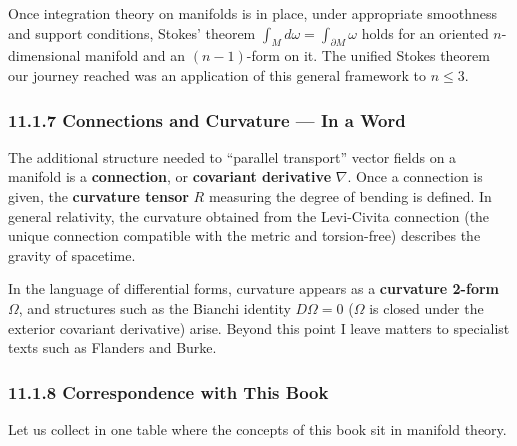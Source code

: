 \documentclass[a4paper,12pt,openany]{book}
\begin{document}
Once integration theory on manifolds is in place, under appropriate
smoothness and support conditions, Stokes' theorem
\(\int_M d\omega = \int_{\partial M} \omega\) holds for an oriented
\(n\)-dimensional manifold and an \((n-1)\)-form on it. The unified
Stokes theorem our journey reached was an application of this general
framework to \(n \le 3\).

\hypertarget{connections-and-curvature-in-a-word}{%
\subsubsection{11.1.7 Connections and Curvature — In a
Word}\label{connections-and-curvature-in-a-word}}

The additional structure needed to ``parallel transport'' vector fields
on a manifold is a \textbf{connection}, or \textbf{covariant derivative}
\(\nabla\). Once a connection is given, the \textbf{curvature tensor}
\(R\) measuring the degree of bending is defined. In general relativity,
the curvature obtained from the Levi-Civita connection (the unique
connection compatible with the metric and torsion-free) describes the
gravity of spacetime.

In the language of differential forms, curvature appears as a
\textbf{curvature 2-form} \(\Omega\), and structures such as the Bianchi
identity \(D\Omega = 0\) (\(\Omega\) is closed under the exterior
covariant derivative) arise. Beyond this point I leave matters to
specialist texts such as Flanders and Burke.

\hypertarget{correspondence-with-this-book}{%
\subsubsection{11.1.8 Correspondence with This
Book}\label{correspondence-with-this-book}}

Let us collect in one table where the concepts of this book sit in
manifold theory.
\end{document}
